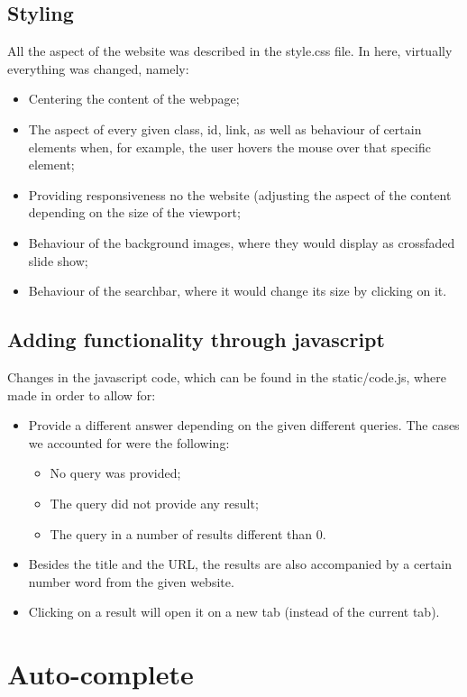 \subsection{Styling}
All the aspect of the website was described in the style.css file. In here, virtually everything was changed, namely:
\begin{itemize}
    \item Centering the content of the webpage;
    \item The aspect of every given class, id, link, as well as behaviour of certain elements when, for example, the user hovers the mouse over that specific element;
    \item Providing responsiveness no the website (adjusting the aspect of the content depending on the size of the viewport;
    \item Behaviour of the background images, where they would display as crossfaded slide show;
    \item Behaviour of the searchbar, where it would change its size by clicking on it.
\end{itemize}
\subsection{Adding functionality through javascript}
Changes in the javascript code, which can be found in the static/code.js, where made in order to allow for:
\begin{itemize}
    \item Provide a different answer depending on the given different queries. The cases we accounted for were the following:
    \begin{itemize}
        \item No query was provided;
        \item The query did not provide any result;
        \item The query in a number of results different than $0$.
    \end{itemize}
    \item Besides the title and the URL, the results are also accompanied by a certain number word from the given website.
    \item Clicking on a result will open it on a new tab (instead of the current tab).
\end{itemize}

\section{Auto-complete}
